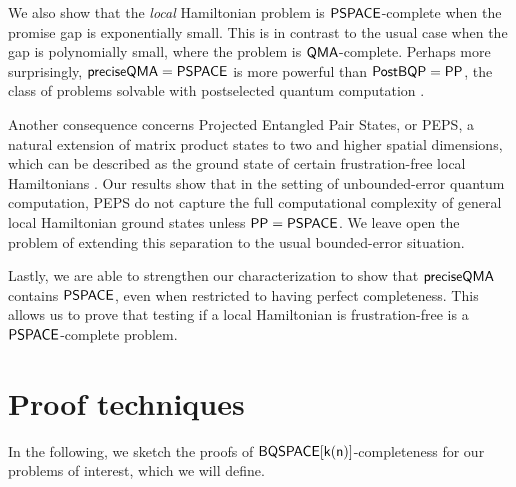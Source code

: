 \documentclass[11pt]{article}
\newcommand{\classfont}{\sf}
\newtheorem{theorem}[lemma]{Theorem}
\newtheorem{definition}[lemma]{Definition}
\numberwithin{lemma}{section}
\theoremstyle{definition}
\newcommand\PostBQP{{\sf{PostBQP}}}
\newcommand\PP{\sf{PP}}
\newcommand\BQSPACE{\sf{BQSPACE}}
\newcommand\PSPACE{\sf{PSPACE}}
\newcommand\preciseQMA{{\sf{preciseQMA}}}
\newcommand\QMA{{\sf{QMA}}}
\newcommand{\Unitary}{\mathbf{U}}
\newcommand{\unitaryBQSPACE}[1]{{\classfont{BQ}_\Unitary\classfont{SPACE}}[#1]}
\newcommand{\poly}{\mathrm{poly}}
\renewcommand{\le}{\leqslant}
\renewcommand{\ge}{\geqslant}
\newcommand\psham[1]{#1\textit{\sf{-Precise Succinct Hamiltonian}}}
\begin{document}
We also show that the \emph{local} Hamiltonian problem is $\PSPACE$-complete when the promise gap is exponentially small. This is in contrast to the usual case when the gap is polynomially small, where the problem is $\QMA$-complete. Perhaps more surprisingly, $\preciseQMA = \PSPACE$ is more powerful than $\PostBQP=\PP$, the class of problems solvable with postselected quantum computation \cite{aaronson05}.

Another consequence concerns Projected Entangled Pair States, or PEPS, a natural extension of matrix product states to two and higher spatial dimensions, which can be described as the ground state of certain frustration-free local Hamiltonians \cite{vc04}. Our results show that in the setting of unbounded-error quantum computation, PEPS do not capture the full computational complexity of general local Hamiltonian ground states unless $\PP=\PSPACE$. We leave open the problem of extending this separation to the usual bounded-error situation.

Lastly, we are able to strengthen our characterization to show that $\preciseQMA$ contains $\PSPACE$, even when restricted to having perfect completeness.  This allows us to prove that testing if a local Hamiltonian is frustration-free is a $\PSPACE$-complete problem.
\section{Proof techniques}
In the following, we sketch the proofs of $\BQSPACE[k(n)]$-completeness for our problems of interest, which we will define.
\end{document}
